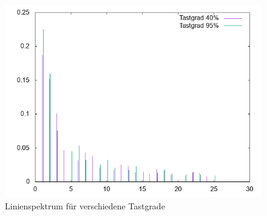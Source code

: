         \begin{figure}
            \includegraphics[width=\textwidth]{A25_plot2.png}
            \caption{Linienspektrum für verschiedene Tastgrade}
        \end{figure}

